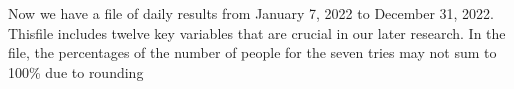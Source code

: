 \documentclass[12pt]{ctexart}
\begin{document}

Now we have a file of daily results from January 7, 2022 to December 31, 2022. Thisfile includes twelve key variables that are crucial in our later research. In the file, the percentages of the number of people for the seven tries may not sum to 100\% due to rounding

\end{document}
